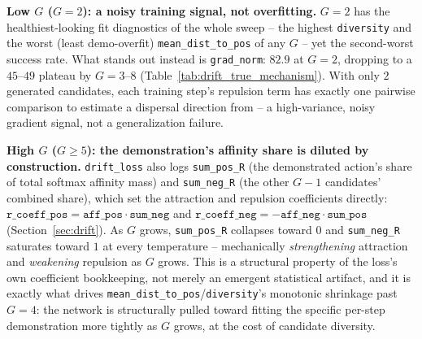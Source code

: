 \documentclass[11pt]{article}
\begin{document}
\textbf{Low $G$ ($G=2$): a noisy training signal, not overfitting.}
$G=2$ has the healthiest-looking fit diagnostics of the whole sweep --
the highest \texttt{diversity} and the worst (least demo-overfit)
\texttt{mean\_dist\_to\_pos} of any $G$ -- yet the second-worst success
rate. What stands out instead is \texttt{grad\_norm}: $82.9$ at $G=2$,
dropping to a $45$--$49$ plateau by $G=3$--$8$ (Table~\ref{tab:drift_true_mechanism}).
With only $2$ generated candidates, each training step's repulsion term
has exactly one pairwise comparison to estimate a dispersal direction
from -- a high-variance, noisy gradient signal, not a generalization
failure.

\textbf{High $G$ ($G\ge5$): the demonstration's affinity share is diluted
by construction.} \texttt{drift\_loss} also logs \texttt{sum\_pos\_R}
(the demonstrated action's share of total softmax affinity mass) and
\texttt{sum\_neg\_R} (the other $G-1$ candidates' combined share), which
set the attraction and repulsion coefficients directly:
$\texttt{r\_coeff\_pos} = \texttt{aff\_pos}\cdot\texttt{sum\_neg}$ and
$\texttt{r\_coeff\_neg} = -\texttt{aff\_neg}\cdot\texttt{sum\_pos}$
(Section~\ref{sec:drift}). As $G$ grows, \texttt{sum\_pos\_R} collapses
toward $0$ and \texttt{sum\_neg\_R} saturates toward $1$ at every
temperature -- mechanically \emph{strengthening} attraction and
\emph{weakening} repulsion as $G$ grows. This is a structural property
of the loss's own coefficient bookkeeping, not merely an emergent
statistical artifact, and it is exactly what drives
\texttt{mean\_dist\_to\_pos}/\texttt{diversity}'s monotonic shrinkage
past $G=4$: the network is structurally pulled toward fitting the
specific per-step demonstration more tightly as $G$ grows, at the cost
of candidate diversity.
\end{document}
